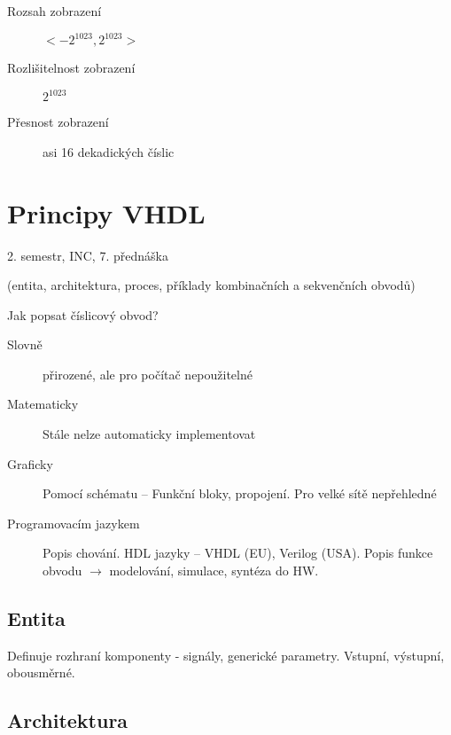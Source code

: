 \documentclass[a4wide]{report}
\begin{document}
\begin{description}
	\item[Rozsah zobrazení] $< -2^{1023}, 2^{1023} >$
	\item[Rozlišitelnost zobrazení] $2^1023$
	\item[Přesnost zobrazení] asi 16 dekadických číslic
\end{description}


















\setcounter{chapter}{9}
\chapter{Principy VHDL} \label{cha:10}

2. semestr, INC, 7. přednáška

(entita, architektura, proces, příklady kombinačních a sekvenčních obvodů)

Jak popsat číslicový obvod?
\begin{description}
	\item[Slovně] přirozené, ale pro počítač nepoužitelné
	\item[Matematicky] Stále nelze automaticky implementovat
	\item[Graficky] Pomocí schématu -- Funkční bloky, propojení. Pro velké sítě nepřehledné
	\item[Programovacím jazykem] Popis chování. HDL jazyky -- VHDL (EU), Verilog (USA). Popis funkce obvodu $\to$ modelování, simulace, syntéza do HW.
\end{description}

\section{Entita}

Definuje rozhraní komponenty - signály, generické parametry. Vstupní, výstupní, obousměrné.

\section{Architektura}
\end{document}
